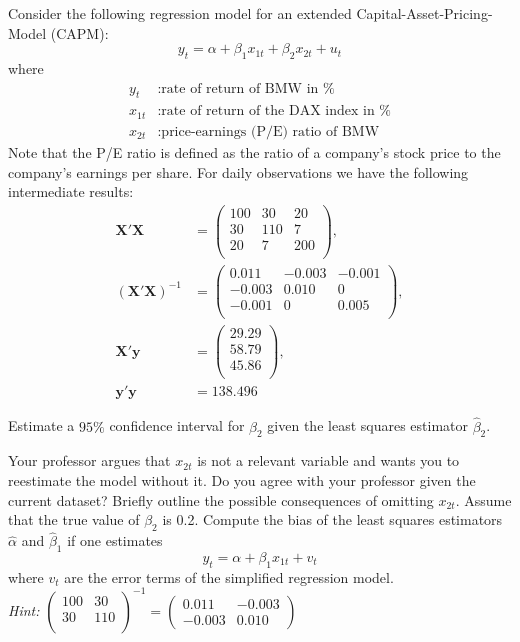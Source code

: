 \documentclass{article}
\begin{document}
\begin{Exercise}[title=(Capital-Asset-Pricing-Model)]
Consider the following regression model for an extended Capital-Asset-Pricing-Model (CAPM):
$$y_t = \alpha + \beta_1 x_{1t} + \beta_2 x_{2t} + u_t$$
where
\begin{align*}
	y_t&: \text{rate of return of BMW in \%}\\
	x_{1t}&: \text{rate of return of the DAX index in \%}\\
	x_{2t}&: \text{price-earnings (P/E) ratio of BMW}
\end{align*}
Note that the P/E ratio is defined as the ratio of a company's stock price to the company's earnings per share. For daily observations we have the following intermediate results:
\begin{align*}
\mathbf{X}'\mathbf{X} &= 
\begin{pmatrix}
100  & 30 & 20\\
30 & 110 & 7\\
20 & 7 & 200\\
\end{pmatrix}, \\
(\mathbf{X}'\mathbf{X})^{-1} &= 
\begin{pmatrix}
0.011  & -0.003 & -0.001\\
-0.003 & 0.010 & 0\\
-0.001 & 0 & 0.005\\
\end{pmatrix},\\
\mathbf{X}'\mathbf{y}&= 
\begin{pmatrix}
29.29\\
58.79\\
45.86\\
\end{pmatrix},\\
\mathbf{y}'\mathbf{y} &= 138.496
\end{align*}

\Question Estimate a $95\%$ confidence interval for $\beta_2$ given the least squares estimator $\hat{\beta}_2$.

\Question Your professor argues that $x_{2t}$ is not a relevant variable and wants you to reestimate the model without it. Do you agree with your professor given the current dataset? Briefly outline the possible consequences of omitting $x_{2t}$.
\Question Assume that the true value of $\beta_2$ is 0.2. Compute the bias of the least squares estimators $\hat{\alpha}$ and $\hat{\beta}_1$ if one estimates
$$y_t = \alpha + \beta_1 x_{1t} + v_t$$
where $v_t$ are the error terms of the simplified regression model.\\\textit{Hint:}
$
\begin{pmatrix}
100 &  30\\
30  &110\\
\end{pmatrix}^{-1}=
\begin{pmatrix}
 0.011 &  -0.003\\
-0.003 &   0.010
\end{pmatrix}
$
\end{Exercise}
\end{document}
